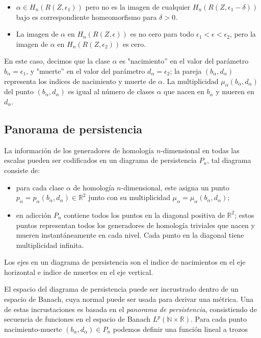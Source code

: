 \begin{itemize}
	\item $\alpha \in H_n(R(Z,\epsilon_1))$ pero no es la imagen de cualquier $H_n(R(Z,\epsilon_1-\delta))$ bajo es correspondiente homeomorfismo para $\delta > 0$.
	\item La imagen de $\alpha$ en $H_n(R(Z,\epsilon))$ es no cero para todo $\epsilon_1 < \epsilon < \epsilon_2$, pero la imagen de $\alpha$ en $H_n(R(Z,\epsilon_2))$ es cero.
\end{itemize}

En este caso, decimos que la clase $\alpha$ es "nacimiento'' en el valor del parámetro $b_\alpha = \epsilon_1$, y "muerte'' en el valor del parámetro $d_\alpha = \epsilon_2$; la pareja $(b_\alpha,d_\alpha)$ representa los indices de  nacimiento y muerte de $\alpha$. La multiplicidad $\mu_\alpha(b_\alpha,d_\alpha)$ del punto $(b_\alpha,d_\alpha)$ es igual al número de clases $\alpha$ que nacen en $b_\alpha$ y mueren en $d_\alpha$.


\subsection{Panorama de persistencia}

La información de los generadores de homología $n$-dimensional en todas las escalas pueden ser codificados en un diagrama de persistencia $P_n$, tal diagrama consiste de:

\begin{itemize}
	\item para cada clase $\alpha$ de homología $n$-dimensional, este asigna un punto $p_\alpha = p_\alpha(b_\alpha,d_\alpha) \in \mathbb{R}^{2}$ junto con su multiplicidad $\mu_\alpha = \mu_\alpha(b_\alpha,d_\alpha)$;
	\item  en adicción $P_n$ contiene todos los puntos en la diagonal positiva de $\mathbb{R}^{2}$; estos puntos representan todos los generadores de homología triviales que nacen y mueren instantáneamente en cada nivel. Cada punto en la diagonal tiene multiplicidad infinita.
\end{itemize}

Los ejes en un diagrama de persistencia son el indice de nacimientos en el eje horizontal e indice de muertes en el eje vertical.

El espacio del diagrama de persistencia puede ser incrustrado dentro de un espacio de Banach, cuya normal puede ser usada para derivar una métrica. Una de estas incrustaciones es basada en el \textit{panorama de persistencia}, consistiendo de secuencia de funciones en el espacio de Banach $L^p\left(\mathbb{N}\times  \mathbb{R}\right)$. Para cada punto nacimiento-muerte $(b_\alpha,d_\alpha) \in P_n$ podemos definir una función lineal a trozos

